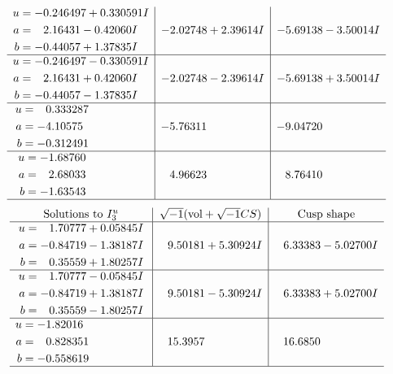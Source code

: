 \documentclass[1p]{elsarticle_modified}
\theoremstyle{definition}
\newcommand{\I}{\sqrt{-1}}
\begin{document}
$$\begin{array}{c|c|c}
\begin{aligned}
u &= -0.246497 + 0.330591 I \\
a &= \phantom{-}2.16431 - 0.42060 I \\
b &= -0.44057 + 1.37835 I\end{aligned}
 & -2.02748 + 2.39614 I & -5.69138 - 3.50014 I \\ \hline\begin{aligned}
u &= -0.246497 - 0.330591 I \\
a &= \phantom{-}2.16431 + 0.42060 I \\
b &= -0.44057 - 1.37835 I\end{aligned}
 & -2.02748 - 2.39614 I & -5.69138 + 3.50014 I \\ \hline\begin{aligned}
u &= \phantom{-}0.333287\phantom{ +0.000000I} \\
a &= -4.10575\phantom{ +0.000000I} \\
b &= -0.312491\phantom{ +0.000000I}\end{aligned}
 & -5.76311\phantom{ +0.000000I} & -9.04720\phantom{ +0.000000I} \\ \hline\begin{aligned}
u &= -1.68760\phantom{ +0.000000I} \\
a &= \phantom{-}2.68033\phantom{ +0.000000I} \\
b &= -1.63543\phantom{ +0.000000I}\end{aligned}
 & \phantom{-}4.96623\phantom{ +0.000000I} & \phantom{-}8.76410\phantom{ +0.000000I}\\
 \hline 
 \end{array}$$\newpage$$\begin{array}{c|c|c}  
\text{Solutions to }I^u_{3}& \I (\text{vol} + \sqrt{-1}CS) & \text{Cusp shape}\\
 \hline 
\begin{aligned}
u &= \phantom{-}1.70777 + 0.05845 I \\
a &= -0.84719 - 1.38187 I \\
b &= \phantom{-}0.35559 + 1.80257 I\end{aligned}
 & \phantom{-}9.50181 + 5.30924 I & \phantom{-}6.33383 - 5.02700 I \\ \hline\begin{aligned}
u &= \phantom{-}1.70777 - 0.05845 I \\
a &= -0.84719 + 1.38187 I \\
b &= \phantom{-}0.35559 - 1.80257 I\end{aligned}
 & \phantom{-}9.50181 - 5.30924 I & \phantom{-}6.33383 + 5.02700 I \\ \hline\begin{aligned}
u &= -1.82016\phantom{ +0.000000I} \\
a &= \phantom{-}0.828351\phantom{ +0.000000I} \\
b &= -0.558619\phantom{ +0.000000I}\end{aligned}
 & \phantom{-}15.3957\phantom{ +0.000000I} & \phantom{-}16.6850\phantom{ +0.000000I}\\
 \hline 
 \end{array}$$\newpage
\end{document}
